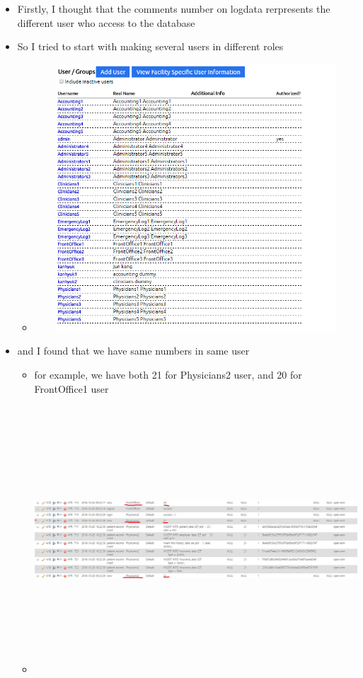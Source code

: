 \documentclass[paper=a4, fontsize=11pt]{scrartcl} %
\numberwithin{equation}{section} %
\numberwithin{figure}{section} %
\numberwithin{table}{section} %
\begin{document}
\begin{itemize}
	\item Firstly, I thought that the comments number on logdata rerpresents the different user who access to the database
	\item So I tried to start with making several users in different roles
		\begin{itemize}
		\item
		 \includegraphics[width = 20cm, height=10cm]{pictures/users.png}
		\end{itemize}
	\item and I found that we have same numbers in same user
	\begin{itemize}
		\item for example, we have both 21 for Physicians2 user, and 20 for FrontOffice1 user
		\item 
		 \includegraphics[width = 20cm, height=10cm]{pictures/samenumberinsameuser1.png}

\end{itemize}
\end{itemize}
\end{document}
